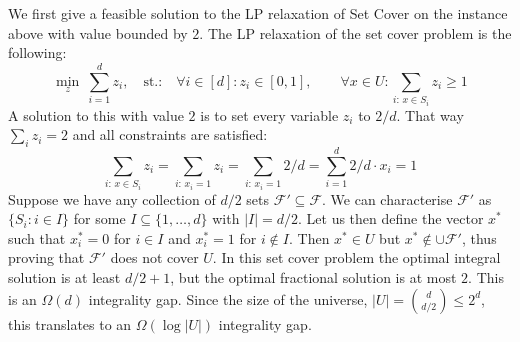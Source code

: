 We first give a feasible solution to the LP relaxation of Set Cover on the instance above with value
bounded by $2$. The LP relaxation of the set cover problem is the following:
\[
  \min_z\ \sum_{i=1}^d z_i,\quad\text{st.:}\quad
  \forall i\in[d]: z_i\in[0,1],\qquad
  \forall x\in U: \sum_{i:\,x\in S_i}z_i\ge 1
\]
A solution to this with value $2$ is to set every variable $z_i$ to $2/d$. That way
$\sum_i z_i=2$ and all constraints are satisfied:
\[
  \sum_{i:\,x\in S_i}z_i=\sum_{i:\,x_i=1}z_i=\sum_{i:\,x_i=1}2/d=\sum_{i=1}^d 2/d\cdot x_i=1
\]
Suppose we have any collection of $d/2$ sets $\mathcal{F}'\subseteq\mathcal{F}$. We can characterise
$\mathcal{F}'$ as $\{S_i: i\in I\}$ for some $I\subseteq\{1,\ldots,d\}$ with $|I|=d/2$. Let us then
define the vector $x^*$ such that $x^*_i=0$ for $i\in I$ and $x^*_i=1$ for $i\notin I$. Then
$x^*\in U$ but $x^*\notin\cup\mathcal{F}'$, thus proving that $\mathcal{F}'$ does not cover $U$. In
this set cover problem the optimal integral solution is at least $d/2+1$, but the optimal fractional
solution is at most $2$. This is an $\Omega(d)$ integrality gap. Since the size of the universe,
$|U|=\binom{d}{d/2}\le 2^d$, this translates to an $\Omega(\log|U|)$ integrality gap.
% 
